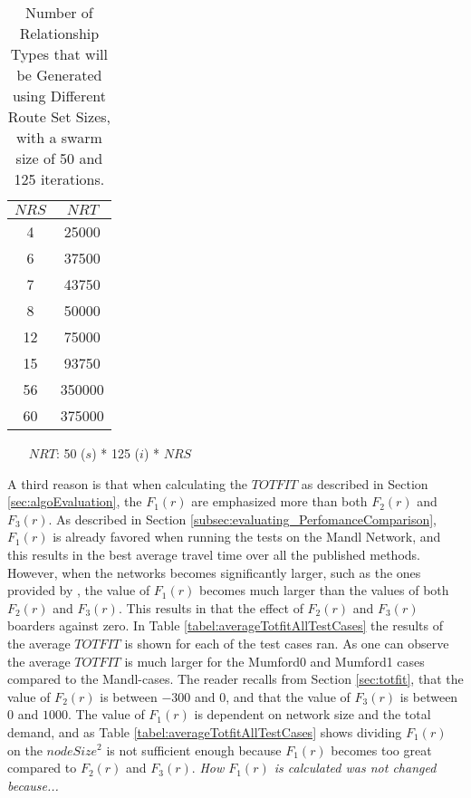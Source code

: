 \begin{table}[H]
    \centering
    \hspace*{-1.0cm}
    \begin{tabular}{|c|c|}
        \hline
        \textbf{$NRS$} & \textbf{$NRT$}\\
        \hline
        4 & 25000\\
        \hline
        6 & 37500\\
        \hline
        7 & 43750\\
        \hline
        8 & 50000\\
        \hline
        12 & 75000\\
        \hline
        15 & 93750\\
        \hline
        56 & 350000\\
        \hline
        60 & 375000\\
        \hline
    \end{tabular}
    \caption{Number of Relationship Types that will be Generated using Different Route Set Sizes, with a swarm size of 50 and 125 iterations.}
    \begin{itemize}[noitemsep]
    \item[$NRT$:] 50 ($s$) * 125 ($i$) * $NRS$
    \end{itemize} 
    \label{tabel:numberOfRelationshipTypes}
\end{table} 

A third reason is that when calculating the $TOTFIT$ as described in Section \vref{sec:algoEvaluation}, the $F_1(r)$ are emphasized more than both $F_2(r)$ and $F_3(r)$. As described in Section \vref{subsec:evaluating_PerfomanceComparison}, $F_1(r)$ is already favored when running the tests on the Mandl Network, and this results in the best average travel time over all the published methods. However, when the networks becomes significantly larger, such as the ones provided by \citet{mumford13}, the value of $F_1(r)$ becomes much larger than the values of both $F_2(r)$ and $F_3(r)$. This results in that the effect of $F_2(r)$ and $F_3(r)$ boarders against zero. In Table \ref{tabel:averageTotfitAllTestCases} the results of the average $TOTFIT$ is shown for each of the test cases ran. As one can observe the average $TOTFIT$ is much larger for the Mumford0 and Mumford1 cases compared to the Mandl-cases. The reader recalls from Section \vref{sec:totfit}, that the value of $F_2(r)$ is between $-300$ and $0$, and that the value of $F_3(r)$ is between $0$ and $1000$. The value of $F_1(r)$ is dependent on network size and the total demand, and as Table \vref{tabel:averageTotfitAllTestCases} shows dividing $F_1(r)$ on the $nodeSize^2$ is not sufficient enough because $F_1(r)$ becomes too great compared to $F_2(r)$ and $F_3(r)$. \emph{\color{blue} How $F_1(r)$ is calculated was not changed because...}

